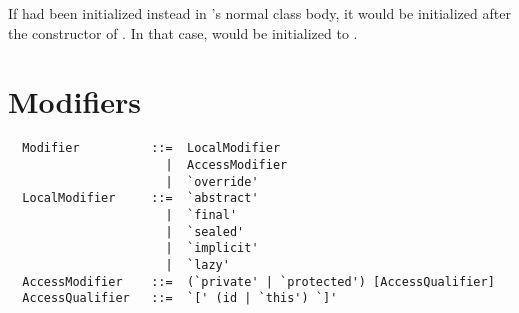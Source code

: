 If  had been initialized instead in 's normal class
body, it would be initialized after the constructor of
. In that case, \lstinline@msg@ would be initialized to
.
  
 
\section{Modifiers}
\label{sec:modifiers}

\syntax\begin{lstlisting}
  Modifier          ::=  LocalModifier 
                      |  AccessModifier
                      |  `override'
  LocalModifier     ::=  `abstract'
                      |  `final'
                      |  `sealed'
                      |  `implicit'
                      |  `lazy'
  AccessModifier    ::=  (`private' | `protected') [AccessQualifier]
  AccessQualifier   ::=  `[' (id | `this') `]'
\end{lstlisting}

